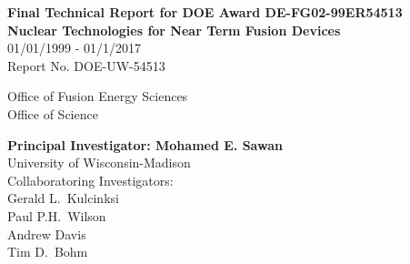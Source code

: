 
\begin{titlepage}
  \begin{center}
    {\Large\bfseries Final Technical Report for DOE Award DE-FG02-99ER54513}\\[1cm]
    {\huge\bfseries Nuclear Technologies for Near Term Fusion Devices}\\[12pt]
    {\Large 01/01/1999 - 01/1/2017}\\
    Report No. DOE-UW-54513

    \vspace{2cm}
    Office of Fusion Energy Sciences\\
    Office of Science
    
    \vspace{2cm}
    {\bfseries Principal Investigator: Mohamed E. Sawan}\\[5pt]
    University of Wisconsin-Madison\\

    \vspace{2cm}
    Collaboratoring Investigators:\\[5pt]
    Gerald L.\ Kulcinksi\\
    Paul P.H.\ Wilson\\
    Andrew Davis\\
    Tim D.\ Bohm
    
    \vfill



    
  \end{center}
\end{titlepage}
